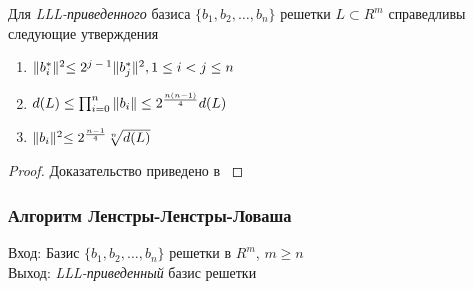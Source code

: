   \begin{theorem}
   Для \textit{LLL-приведенного} базиса {$\{ b_1, b_2, \dots, b_n \}$} решетки {$L \subset R^m$} справедливы следующие утверждения
   
   \begin{enumerate}
    \item \textit{{$ \lVert b_i^* \lVert^2 \le 2\textsuperscript{{$j-1$}} \lVert b_j^* \lVert^2, 1 \le i < j \le n  $}}
    \item \textit{{$ d(L) \le \prod_{i=0}^{n}{ \lVert b_i \lVert } \le 2\textsuperscript{{$\frac{n(n-1)}{4}$}} d(L) $}}
    \item \textit{{$ \lVert b_i \lVert^2 \le 2\textsuperscript{{$\frac{n-1}{4}$}} \sqrt[n]{d(L)} $}}
   \end{enumerate}

   \begin{proof}
      Доказательство приведено в \cite[Глава 8.2, страница 266]{mah06}
   \end{proof}

  \end{theorem}
  
  \subsubsection{Алгоритм Ленстры-Ленстры-Ловаша}
    Вход: Базис {$\{ b_1,b_2, \dots, b_n \}$} решетки в {$R^m$}, {$m \ge n$} \\
    Выход: \textit{LLL-приведенный} базис решетки
  
